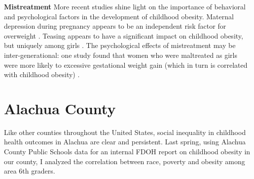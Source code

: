 \begin{multicols}{2}
\textbf{Mistreatment} More recent studies shine light on the importance of behavioral and psychological factors in the development of childhood obesity.  Maternal depression during pregnancy appears to be an independent risk factor for overweight \cite{Taveras2010}.  Teasing appears to have a significant impact on childhood obesity, but uniquely among girls \cite{Feeg2014}. The psychological effects of mistreatment may be inter-generational: one study found that women who were maltreated as girls were more likely to excessive gestational weight gain (which in turn is correlated with childhood obesity) \cite{Diesel2014}.

\section*{Alachua County}
Like other counties throughout the United States, social inequality in childhood health outcomes in Alachua are clear and persistent.  Last spring, using Alachua County Public Schools data for an internal FDOH report on childhood obesity in our county, I analyzed the correlation between race, poverty and obesity among area 6th graders. %


\end{multicols}
